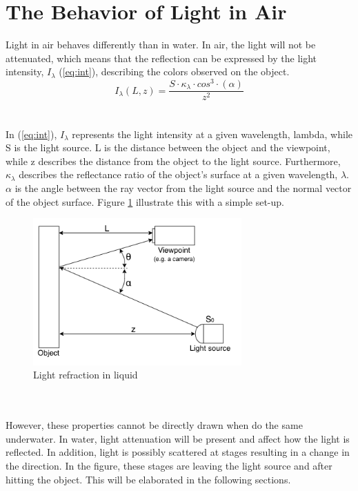 \vspace{1.3cm}
\section{The Behavior of Light in Air}
Light in air behaves differently than in water. In air, the light will not be attenuated, which means that the reflection can be expressed by the light intensity, $I_ {\lambda}$ (\ref{eq:int}), describing the colors observed on the object.
\begin{equation} \label{eq:int}
    I_ {\lambda} (L, z) = \frac{S \cdot \kappa_{\lambda}\cdot cos^{3}\cdot (\alpha)}{z^2}
\end{equation}
\\\\
In (\ref{eq:int}), $I_{\lambda}$ represents the light intensity at a given wavelength, lambda, while S is the light source. L is the distance between the object and the viewpoint, while z describes the distance from the object to the light source. Furthermore, $\kappa_{\lambda}$ describes the reflectance ratio of the object's surface at a given wavelength, $\lambda$. $\alpha$ is the angle between the ray vector from the light source and the normal vector of the object surface. Figure \ref{fig:reflectance} illustrate this with a simple set-up.
\begin{figure}[H]
\centering
  \includegraphics[width=8cm]{Images/theory/reflectance.png}
  \caption{Light refraction in liquid}
  \label{fig:reflectance}
\end{figure}
\\\\
\noindent
However, these properties cannot be directly drawn when do the same underwater. In water, light attenuation will be present and affect how the light is reflected. In addition, light is possibly scattered at stages resulting in a change in the direction. In the figure, these stages are leaving the light source and after hitting the object. This will be elaborated in the following sections.

